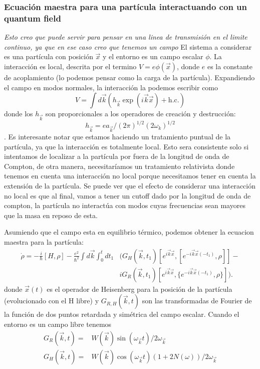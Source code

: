 \subsubsection{Ecuación maestra para una partícula interactuando con un quantum field}
\textit{Esto creo que puede servir para pensar en una linea de transmisión en el limite continuo, ya que en ese caso creo que tenemos un campo}
El sistema a considerar es una partícula con posición $\vec{x}$ y el entorno es un campo escalar $\phi$. La interacción es local, descrita por el termino $V=e\phi(\vec x)$, donde $e$ es la constante de acoplamiento (lo podemos pensar como la carga de la partícula). Expandiendo el campo en modos normales, la interacción la podemos escribir como
$$V=\int d\vec k (h_{\vec k}\exp(i\vec k \vec x) + \text{h.c.})$$ donde los $h_{\vec k}$ son proporcionales a los operadores de creación y destrucción:
$$h_{\vec k} = e a_{\vec k} /(2\pi)^{1/2}(2\omega_k)^{1/2}$$.
Es interesante notar que estamos haciendo un tratamiento puntual de la partícula, ya que la interacción es totalmente local. Esto sera consistente solo si intentamos de localizar a la partícula por fuera de la longitud de onda de Compton, de otra manera, necesitaríamos un tratamiento relativista donde tenemos en cuenta una interacción no local porque necesitamos tener en cuenta la extensión de la partícula. Se puede ver que el efecto de considerar una interacción no local es que al final, vamos a tener un cutoff dado por la longitud de onda de compton, la partícula no interactúa con modos cuyas frecuencias sean mayores que la masa en reposo de esta.

Asumiendo que el campo esta en equilibrio térmico, podemos obtener la ecuacion maestra para la partícula:
\begin{equation}
\begin{split}
    \dot \rho =  -\frac{i}{\hbar}[H,\rho]-\frac{e^2}{\hbar^2}\int d\vec k \int_0^t dt_1&\bigg(G_H(\vec k,t_1)[e^{i\vec k \vec x},[e^{-i\vec k \vec x(-t_1)},\rho]] -\\ & iG_R(\vec k,t_1)[e^{i\vec k \vec x},\{e^{-i\vec k \vec x(-t_1)},\rho\}]\bigg).
\end{split}
\end{equation}
donde $\vec x(t)$ es el operador de Heisenberg para la posición de la partícula (evolucionado con el H libre) y $G_{R,H}(\vec k,t)$ son las transformadas de Fourier de la función de dos puntos retardada y simétrica del campo escalar. Cuando el entorno es un campo libre tenemos
\begin{equation}
\begin{aligned}
    G_R(\vec{k},t) = & W(\vec k)\sin(\omega_{\vec k} t)/2\omega_{\vec k} \\
    G_H(\vec{k},t) = & W(\vec k)\cos(\omega_{\vec k} t)(1+2N(\omega))/2\omega_{\vec k} 
\end{aligned}    
\end{equation}
